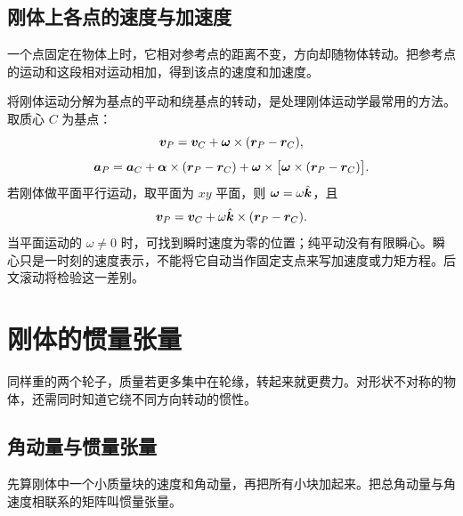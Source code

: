 \subsection{刚体上各点的速度与加速度}

一个点固定在物体上时，它相对参考点的距离不变，方向却随物体转动。把参考点的运动和这段相对运动相加，得到该点的速度和加速度。

将刚体运动分解为基点的平动和绕基点的转动，是处理刚体运动学最常用的方法。取质心 \(C\) 为基点：
\begin{equation}
\boldsymbol{v}_P=\boldsymbol{v}_C+\boldsymbol{\omega}\times(\boldsymbol{r}_P-\boldsymbol{r}_C),
\label{eq:velocity-decomp}
\end{equation}
\begin{equation}
\boldsymbol{a}_P=\boldsymbol{a}_C+\boldsymbol\alpha\times(\boldsymbol{r}_P-\boldsymbol{r}_C)
+\boldsymbol{\omega}\times\bigl[\boldsymbol{\omega}\times(\boldsymbol{r}_P-\boldsymbol{r}_C)\bigr].
\label{eq:acceleration-decomp}
\end{equation}
若刚体做平面平行运动，取平面为 \(xy\) 平面，则 \(\boldsymbol{\omega}=\omega\hat{\boldsymbol k}\)，且
\[
\boldsymbol{v}_P=\boldsymbol{v}_C+\omega\hat{\boldsymbol k}\times(\boldsymbol{r}_P-\boldsymbol{r}_C).
\]
当平面运动的 $\omega\ne0$ 时，可找到瞬时速度为零的位置；纯平动没有有限瞬心。瞬心只是一时刻的速度表示，不能将它自动当作固定支点来写加速度或力矩方程。后文滚动将检验这一差别。

\section{刚体的惯量张量}

同样重的两个轮子，质量若更多集中在轮缘，转起来就更费力。对形状不对称的物体，还需同时知道它绕不同方向转动的惯性。

\subsection{角动量与惯量张量}

先算刚体中一个小质量块的速度和角动量，再把所有小块加起来。把总角动量与角速度相联系的矩阵叫惯量张量。


